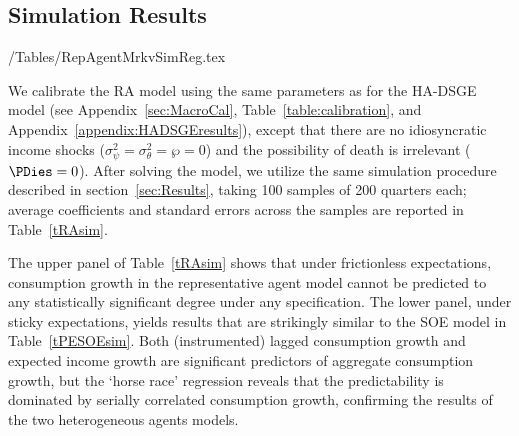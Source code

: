 \subsection{Simulation Results}

\econtexRoot/Tables/RepAgentMrkvSimReg.tex

We calibrate the RA model using the same parameters as for the
HA-DSGE model (see Appendix~\ref{sec:MacroCal}, Table~\ref{table:calibration}, and Appendix~\ref{appendix:HADSGEresults}),
except that there are no idiosyncratic income shocks
($\sigma^2_\psi = \sigma^2_\theta = \wp = 0$) and the possibility
of death is irrelevant ($\PDies=0$).  After solving the model, we
utilize the same simulation procedure described in section~\ref{sec:Results},
taking 100 samples of 200 quarters each; average coefficients
and standard errors across the samples are reported in Table~\ref{tRAsim}.

The upper panel of Table~\ref{tRAsim} shows that under frictionless
expectations, consumption growth in the representative agent model
cannot be predicted to any statistically significant degree under any
specification.  The lower panel, under sticky expectations, yields
results that are strikingly similar to the SOE model in Table~\ref{tPESOEsim}.
Both (instrumented) lagged consumption growth and expected income
growth are significant predictors of aggregate consumption growth,
but the `horse race' regression reveals that the predictability is
dominated by serially correlated consumption growth, confirming the
results of the two heterogeneous agents models.
